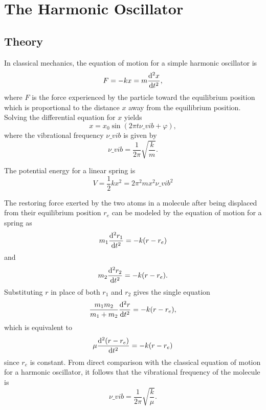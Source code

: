 \section{The Harmonic Oscillator}
\label{s:the_harmonic_oscillator}

\subsection{Theory}

In classical mechanics, the equation of motion for a simple harmonic oscillator is
\begin{equation*}
    F = -kx = m\odv[2]{x}{t},
\end{equation*}
where $F$ is the force experienced by the particle toward the equilibrium position which is proportional to the distance $x$ away from the equilibrium position. Solving the differential equation for $x$ yields
\begin{equation*}
    x = x_{0}\sin(2\pi t\nu\_{vib} + \varphi),
\end{equation*}
where the vibrational frequency $\nu\_{vib}$ is given by
\begin{equation*}
    \nu\_{vib} = \frac{1}{2\pi}\sqrt{\frac{k}{m}}.
\end{equation*}

The potential energy for a linear spring is
\begin{equation*}
    V = \frac{1}{2}kx^{2} = 2\pi^{2}mx^{2}\nu\_{vib}^{2}
\end{equation*}

The restoring force exerted by the two atoms in a molecule after being displaced from their equilibrium position $r_{e}$ can be modeled by the equation of motion for a spring as
\begin{equation*}
    m_{1}\odv[2]{r_{1}}{t} = -k(r - r_{e})
\end{equation*}
and
\begin{equation*}
    m_{2}\odv[2]{r_{2}}{t} = -k(r - r_{e}).
\end{equation*}
Substituting $r$ in place of both $r_{1}$ and $r_{2}$ gives the single equation
\begin{equation*}
    \frac{m_{1}m_{2}}{m_{1} + m_{2}}\odv[2]{r}{t} = -k(r - r_{e}),
\end{equation*}
which is equivalent to
\begin{equation*}
    \mu\odv[2]{(r - r_{e})}{t} = -k(r - r_{e})
\end{equation*}
since $r_{e}$ is constant. From direct comparison with the classical equation of motion for a harmonic oscillator, it follows that the vibrational frequency of the molecule is
\begin{equation*}
    \nu\_{vib} = \frac{1}{2\pi}\sqrt{\frac{k}{\mu}}.
\end{equation*}

